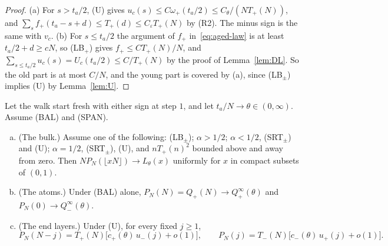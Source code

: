 \begin{proof}
(a) For $s>t_a/2$, (U) gives $u_c(s)\le C\omega_\plus(t_a/2)\le C_\theta/(NT_\plus(N))$, and
$\sum_sf_\plus(t_a-s+d)\le T_\plus(d)\le C_\varepsilon T_\plus(N)$ by (R2). The minus sign is the same
with $v_c$. (b) For $s\le t_a/2$ the argument of $f_\plus$ in~\eqref{eq:aged-law} is at least
$t_a/2+d\ge cN$, so (LB$_\plus$) gives $f_\plus\le CT_\plus(N)/N$, and
$\sum_{s\le t_a/2}u_c(s)=U_c(t_a/2)\le C/T_\plus(N)$ by the proof of Lemma~\ref{lem:DL}. So the old
part is at most $C/N$, and the young part is covered by (a), since (LB$_\pm$) implies (U) by
Lemma~\ref{lem:U}.
\end{proof}

\begin{introtheorem}\label{thm:aging}
Let the walk start fresh with either sign at step $1$, and let $t_a/N\to\theta\in(0,\infty)$.
Assume (BAL) and (SPAN).
\begin{enumerate}[(a)]
\item (The bulk.) Assume one of the following: (LB$_\pm$); $\alpha>1/2$; $\alpha<1/2$,
(SRT$_\pm$) and (U); $\alpha=1/2$, (SRT$_\pm$), (U), and $nT_\plus(n)^2$ bounded above and away
from zero. Then $NP_N(\lfloor xN\rfloor)\to L_\theta(x)$ uniformly for $x$ in compact subsets
of $(0,1)$.
\item (The atoms.) Under (BAL) alone, $P_N(N)=Q_\plus(N)\to Q^\infty_\plus(\theta)$ and
$P_N(0)\to Q^\infty_\minus(\theta)$.
\item (The end layers.) Under (U), for every fixed $j\ge1$,
\[
 P_N(N-j)=T_\plus(N)\bigl[c_\plus(\theta)\,u_\minus(j)+o(1)\bigr],\qquad
 P_N(j)=T_\minus(N)\bigl[c_\minus(\theta)\,u_\plus(j)+o(1)\bigr].
\]
\end{enumerate}
\end{introtheorem}

